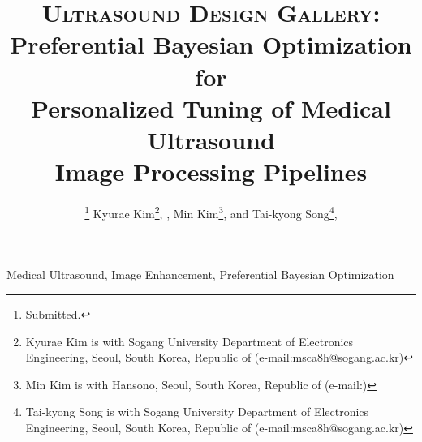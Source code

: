 \documentclass[journal,twoside,web]{ieeecolor}
\begin{document}
\title{\textsc{Ultrasound Design Gallery}: \\ Preferential Bayesian Optimization for \\ Personalized Tuning of Medical Ultrasound \\ Image Processing Pipelines}
\author{
  \thanks{Submitted.}
%
  Kyurae Kim\thanks{Kyurae Kim is with Sogang University Department of Electronics Engineering, Seoul, South Korea, Republic of (e-mail:msca8h@sogang.ac.kr)},
  , Min Kim\thanks{Min Kim is with Hansono, Seoul, South Korea, Republic of (e-mail:)},
  and Tai-kyong Song\thanks{Tai-kyong Song is with Sogang University Department of Electronics Engineering, Seoul, South Korea, Republic of (e-mail:msca8h@sogang.ac.kr)}, 
}%
%


\maketitle

\begin{abstract}
  
\end{abstract}

\begin{IEEEkeywords}
  Medical Ultrasound, Image Enhancement, Preferential Bayesian Optimization
\end{IEEEkeywords}










\end{document}
